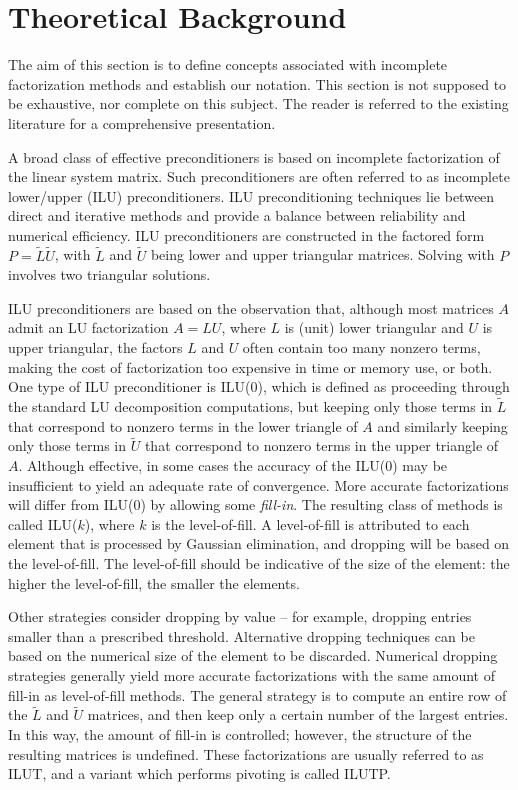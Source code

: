 
\section{Theoretical Background}
\label{sec:ifpack_theoretical}

The aim of this section is to define concepts associated with incomplete
factorization methods and establish our notation. This section is not
supposed to be exhaustive, nor complete on this subject. The reader is
referred to the existing literature for a comprehensive presentation.

\medskip

A broad class of effective preconditioners is based on incomplete
factorization of the linear system matrix.  Such preconditioners are often
referred to as incomplete lower/upper (ILU) preconditioners.  
ILU preconditioning techniques lie between direct and
iterative methods and provide a balance between reliability and
numerical efficiency.  ILU preconditioners are constructed in the factored form
$P=\tilde{L} \tilde{U}$, with $\tilde{L}$ and $\tilde{U}$ being lower
and upper triangular matrices. Solving with $P$ involves two triangular
solutions.

ILU preconditioners are based on the observation
that, although most matrices $A$ admit an LU factorization $A=LU$, where $L$ is
(unit) lower triangular and $U$ is upper triangular, the factors $L$ and $U$ often
contain too many nonzero terms, making the cost of factorization too expensive in
time or memory use, or both.  One type of ILU preconditioner is ILU(0), which 
is defined as proceeding through the standard LU decomposition computations, but keeping 
only those terms in $\tilde{L}$ that correspond to nonzero terms in the lower
triangle of $A$ and similarly keeping only those terms in $\tilde{U}$ that 
correspond to nonzero terms in the upper triangle of $A$.  Although effective, in
some cases the accuracy of the ILU(0) may be insufficient to yield an
adequate rate of convergence. More accurate factorizations will differ
from ILU(0) by allowing some {\em fill-in}. The resulting class of
methods is called ILU($k$), where $k$ is the level-of-fill. A
level-of-fill is attributed to each element that is processed by
Gaussian elimination, and dropping will be based on the level-of-fill.
The level-of-fill should be indicative of the size of the element: the
higher the level-of-fill, the smaller the elements.  

Other strategies consider dropping by value -- for example, dropping
entries smaller than a prescribed threshold. Alternative dropping
techniques can be based on the numerical size of the element to be
discarded. Numerical dropping strategies generally yield more accurate
factorizations with the same amount of fill-in as level-of-fill
methods. The general strategy is to compute an entire row of the
$\tilde{L}$ and $\tilde{U}$ matrices, and then keep only a certain
number of the largest
entries. In this way, the amount of fill-in is
controlled; however, the structure of the resulting matrices is
undefined. These factorizations are usually referred to as ILUT, and a
variant which performs pivoting is called ILUTP.  

